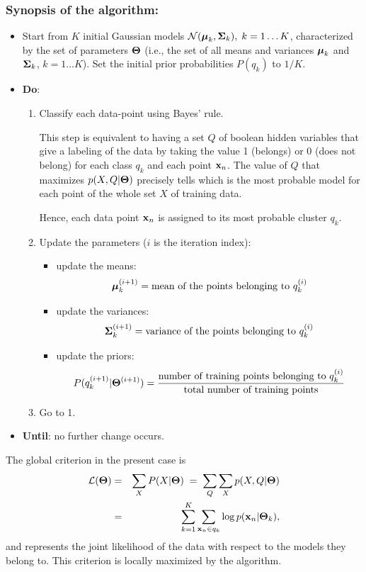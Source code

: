 \documentclass[a4paper]{article}
\newcommand{\xv}{\ensuremath\mathbf{x}}  %
\newcommand{\muv}{\ensuremath\boldsymbol{\mu}}  %
\newcommand{\Sm}{\ensuremath\boldsymbol{\Sigma}}  %
\newcommand{\Tm}{\ensuremath\boldsymbol{\Theta}}  %
\begin{document}
\subsubsection*{Synopsis of the algorithm:}
\begin{itemize}
\item Start from $K$ initial Gaussian models ${\cal N}(\muv_{k},\Sm_{k}),
\; k=1\ldots K$, characterized by the set of parameters $\Tm$ (i.e., the
set of all means and variances $\muv_k$ and $\Sm_k$, $k=1\ldots K$). Set
the initial prior probabilities $P(q_k)$ to $1/K$.
\item {\bf Do}:
\begin{enumerate}
\item Classify each data-point using Bayes' rule.

This step is equivalent to having a set $Q$ of boolean hidden variables
that give a labeling of the data by taking the value 1 (belongs) or 0 (does
not belong) for each class $q_k$ and each point $\xv_n$. The value of $Q$
that maximizes $p(X,Q|\Tm)$ precisely tells which is the most probable
model for each point of the whole set $X$ of training data.

Hence, each data point $\xv_n$ is assigned to its most probable
cluster $q_k$.
\item Update the parameters ($i$ is the iteration index):
\begin{itemize}
\item update the means:
    \[
    \muv_{k}^{(i+1)} = \mbox{mean of the points belonging to } q_k^{(i)}
    \]
\item update the variances:
    \[
    \Sm_{k}^{(i+1)} = \mbox{variance of the points belonging to } q_k^{(i)}
    \]
\item update the priors:
    \[
    P(q_k^{(i+1)}|\Tm^{(i+1)}) = \frac{\mbox{number of training points
        belonging to } q_k^{(i)} }{\mbox{total number of training points}}
    \]
\end{itemize}
\item Go to 1.
\end{enumerate}
\item {\bf Until}: no further change occurs.
\end{itemize}
The global criterion in the present case is
\begin{eqnarray*}
  {\cal L}(\Tm) &=& \sum_{X} P(X|\Tm) \;=\; \sum_{Q} \sum_{X} p(X,Q|\Tm) \\
  &=& \sum_{k=1}^{K} \sum_{\xv_n \in q_k} \log p(\xv_n|\Tm_k),
\end{eqnarray*}
and represents the joint likelihood of the data with respect to the models
they belong to. This criterion is locally maximized by the algorithm.
\end{document}
